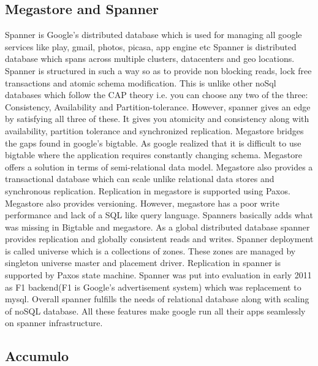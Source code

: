 \subsection{Megastore and Spanner}

     Spanner \cite{corbett-spanner} is Google's distributed database
     which is used for managing all google services like play, gmail,
     photos, picasa, app engine etc Spanner is distributed database
     which spans across multiple clusters, datacenters and geo
     locations.  Spanner is structured in such a way so as to provide
     non blocking reads, lock free transactions and atomic schema
     modification. This is unlike other noSql databases which follow
     the CAP theory i.e. you can choose any two of the three:
     Consistency, Availability and Partition-tolerance. However,
     spanner gives an edge by satisfying all three of these. It gives
     you atomicity and consistency along with availability, partition
     tolerance and synchronized replication.  Megastore bridges the
     gaps found in google's bigtable. As google realized that it is
     difficult to use bigtable where the application requires
     constantly changing schema. Megastore offers a solution in terms
     of semi-relational data model.  Megastore
     \cite{www-magastore-spanner} also provides a transactional
     database which can scale unlike relational data stores and
     synchronous replication.  Replication in megastore is supported
     using Paxos. Megastore also provides versioning. However,
     megastore has a poor write performance and lack of a SQL like
     query language. Spanners basically adds what was missing in
     Bigtable and megastore. As a global distributed database spanner
     provides replication and globally consistent reads and
     writes. Spanner deployment is called universe which is a
     collections of zones. These zones are managed by singleton
     universe master and placement driver. Replication in spanner is
     supported by Paxos state machine. Spanner was put into evaluation
     in early 2011 as F1 backend(F1 is Google's advertisement system)
     which was replacement to mysql. Overall spanner fulfills the needs
     of relational database along with scaling of noSQL database.  All
     these features make google run all their apps seamlessly on
     spanner infrastructure.

\subsection{Accumulo}

